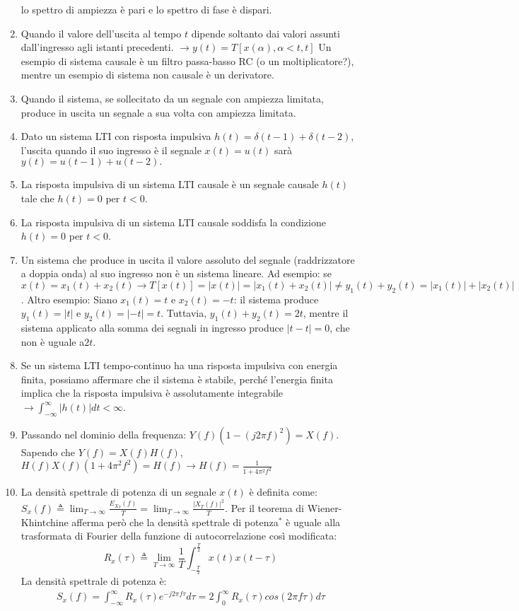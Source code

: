 \documentclass[
  paper=a4,
  ,captions=tableheading
]{scrartcl}
\begin{document}
\begin{enumerate}
  lo spettro di ampiezza è pari e lo spettro di fase è dispari.
\item
  Quando il valore dell'uscita al tempo \(t\) dipende soltanto dai
  valori assunti dall'ingresso agli istanti precedenti.
  \(\to y(t) = T[x(\alpha), \alpha < t, t]\) Un esempio di sistema
  causale è un filtro passa-basso RC (o un moltiplicatore?), mentre un
  esempio di sistema non causale è un derivatore.
\item
  Quando il sistema, se sollecitato da un segnale con ampiezza limitata,
  produce in uscita un segnale a sua volta con ampiezza limitata.
\item
  Dato un sistema LTI con risposta impulsiva
  \(h(t) = \delta(t - 1) + \delta(t - 2)\), l'uscita quando il suo
  ingresso è il segnale \(x(t) = u(t)\) sarà
  \(y(t) = u(t - 1) + u(t - 2).\)
\item
  La risposta impulsiva di un sistema LTI causale è un segnale causale
  \(h(t)\) tale che \(h(t) = 0\) per \(t < 0\).
\item
  La risposta impulsiva di un sistema LTI causale soddisfa la condizione
  \(h(t) = 0\) per \(t < 0\).
\item
  Un sistema che produce in uscita il valore assoluto del segnale
  (raddrizzatore a doppia onda) al suo ingresso non è un sistema
  lineare. Ad esempio: se
  \(\displaystyle x(t)=  x_1(t)+x_2(t) \to T[x(t)]  = |x(t)| = |x_1(t)+x_2(t)| \neq y_1(t)+y_2(t) = |x_1(t)|+|x_2(t)|\).
  Altro esempio: Siano \(x_1(t) = t\) e \(x_2(t) = -t\): il sistema
  produce \(y_1(t) = |t|\) e \(y_2(t) = |-t| = t\). Tuttavia,
  \(y_1(t) + y_2(t) = 2t\), mentre il sistema applicato alla somma dei
  segnali in ingresso produce \(|t - t| = 0\), che non è uguale a\(2t\).
\item
  Se un sistema LTI tempo-continuo ha una risposta impulsiva con energia
  finita, possiamo affermare che il sistema è stabile, perché l'energia
  finita implica che la risposta impulsiva è assolutamente integrabile
  \(\to  \displaystyle \int_{-\infty}^\infty |h(t)| dt < \infty\).
\item
  Passando nel dominio della frequenza:
  \(\displaystyle Y(f)(1-(j2\pi f)^2)=X(f)\). Sapendo che
  \(Y(f)=X(f)H(f)\),
  \(\displaystyle H(f)X(f)(1+4\pi^2 f^2)=H(f) \to H(f)=\frac{1}{1+4\pi^2 f^2}\)
\item
  La densità spettrale di potenza di un segnale \(x(t)\) è definita
  come:
  \(\displaystyle S_x(f) \triangleq \lim_{T \to \infty} \frac{E_{X_T}(f)}{T} = \lim_{T \to \infty} \frac{|X_T(f)|^2}{T}\).
  Per il teorema di Wiener-Khintchine afferma però che la densità
  spettrale di potenza\(^*\) è uguale alla trasformata di Fourier della
  funzione di autocorrelazione così modificata: \[
  R_x(\tau) \triangleq  \lim_{T \to \infty} \frac{1}{T} \int_{-\frac{T}{2}}^{\frac{T}{2}}x(t)x(t-\tau)
  \] La densità spettrale di potenza è:
  \begin{gather*}\displaystyle S_x(f)= \int_{-\infty}^{\infty} R_x(\tau)e^{-j2 \pi f \tau} d\tau = 2\int_{0}^{\infty}  R_x(\tau) cos(2 \pi f \tau) d\tau
  \end{gather*}
\end{enumerate}
\end{document}

